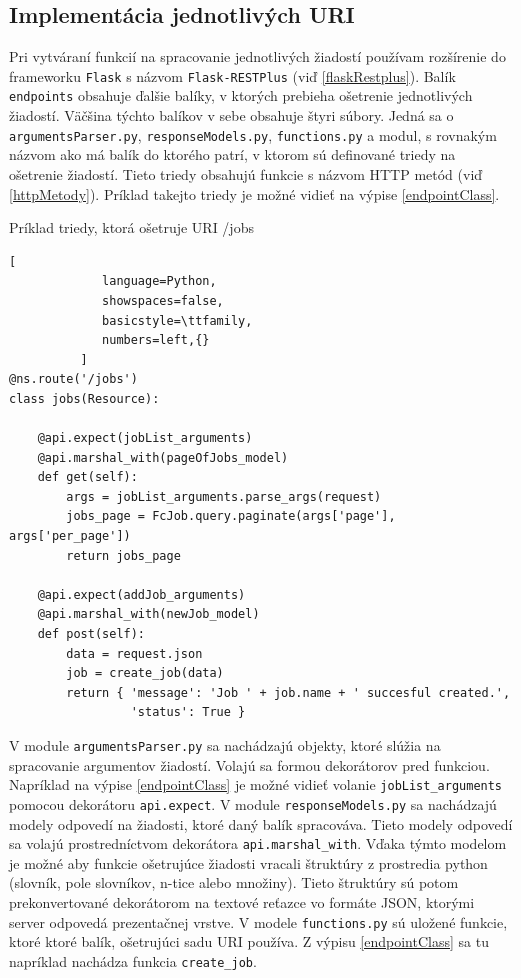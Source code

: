 \documentclass[slovak]{fitthesis}
\begin{document}
\subsection{Implementácia jednotlivých URI}
Pri vytváraní funkcií na spracovanie jednotlivých žiadostí používam rozšírenie do frameworku \texttt{Flask} s názvom \texttt{Flask-RESTPlus} (viď \ref{flaskRestplus}). Balík \texttt{endpoints} obsahuje ďalšie balíky, v ktorých prebieha ošetrenie jednotlivých žiadostí. Väčšina týchto balíkov v sebe obsahuje štyri súbory. Jedná sa o \texttt{argumentsParser.py}, \texttt{responseModels.py}, \texttt{functions.py} a modul, s rovnakým názvom ako má balík do ktorého patrí, v ktorom sú definované triedy na ošetrenie žiadostí. Tieto triedy obsahujú funkcie s názvom HTTP metód (viď \ref{httpMetody}). Príklad takejto triedy je možné vidieť na výpise \ref{endpointClass}.
\begin{algorithm}
  \caption{Príklad triedy, ktorá ošetruje URI /jobs}
  \label{endpointClass}
  \begin{lstlisting}[
             language=Python,
             showspaces=false,
             basicstyle=\ttfamily,
             numbers=left,{}
          ]
@ns.route('/jobs')
class jobs(Resource):

    @api.expect(jobList_arguments)
    @api.marshal_with(pageOfJobs_model)
    def get(self):
        args = jobList_arguments.parse_args(request)
        jobs_page = FcJob.query.paginate(args['page'], args['per_page'])
        return jobs_page

    @api.expect(addJob_arguments)
    @api.marshal_with(newJob_model)
    def post(self):
        data = request.json
        job = create_job(data)
        return { 'message': 'Job ' + job.name + ' succesful created.',
                 'status': True }
  \end{lstlisting}
\end{algorithm}
V module \texttt{argumentsParser.py} sa nachádzajú objekty, ktoré slúžia na spracovanie argumentov žiadostí. Volajú sa formou dekorátorov pred funkciou. Napríklad na výpise \ref{endpointClass} je možné vidieť volanie \texttt{jobList\_arguments} pomocou dekorátoru \texttt{api.expect}. V module \texttt{responseModels.py} sa nachádzajú modely odpovedí na žiadosti, ktoré daný balík spracováva. Tieto modely odpovedí sa volajú prostredníctvom dekorátora \texttt{api.marshal\_with}. Vďaka týmto modelom je možné aby funkcie ošetrujúce žiadosti vracali štruktúry z prostredia python (slovník, pole slovníkov, n-tice alebo množiny). Tieto štruktúry sú potom prekonvertované dekorátorom na textové reťazce vo formáte JSON, ktorými server odpovedá prezentačnej vrstve. V modele \texttt{functions.py} sú uložené funkcie, ktoré ktoré balík, ošetrujúci sadu URI používa. Z výpisu \ref{endpointClass} sa tu napríklad nachádza funkcia \texttt{create\_job}.
\end{document}
